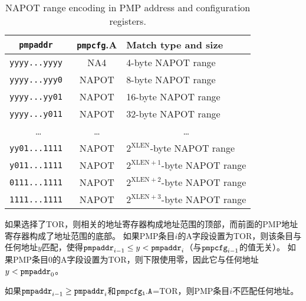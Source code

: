 {\begin{table*}[h!]
\begin{center}
  \begin{tabular}{|c|c|l|}
  \hline
  \tt pmpaddr    & {\tt pmpcfg}.A & Match type and size \\
  \hline
  \tt yyyy...yyyy & NA4   & 4-byte NAPOT range \\
  \tt yyyy...yyy0 & NAPOT & 8-byte NAPOT range \\
  \tt yyyy...yy01 & NAPOT & 16-byte NAPOT range \\
  \tt yyyy...y011 & NAPOT & 32-byte NAPOT range \\
  \multicolumn{1}{|c|}{\ldots} &  \ldots  & \multicolumn{1}{|c|}{\ldots} \\
  \tt yy01...1111 & NAPOT & $2^{\text{XLEN}}$-byte NAPOT range \\
  \tt y011...1111 & NAPOT & $2^{\text{XLEN}+1}$-byte NAPOT range \\
  \tt 0111...1111 & NAPOT & $2^{\text{XLEN}+2}$-byte NAPOT range \\
  \tt 1111...1111 & NAPOT & $2^{\text{XLEN}+3}$-byte NAPOT range \\
  \hline
  \end{tabular}
\end{center}
\caption{NAPOT range encoding in PMP address and configuration registers.}
\label{pmpcfg-napot}
\end{table*}

\iffalse
If TOR is selected, the associated address register forms the top of the
address range, and the preceding PMP address register forms the bottom of the
address range.  If PMP entry $i$'s A field is set to TOR, the entry matches
any address $y$ such that ${\tt pmpaddr}_{i-1}\leq y < {\tt pmpaddr}_i$
(irrespective of the value of ${\tt pmpcfg}_{i-1}$).
If
PMP entry 0's A field is set to TOR, zero is used for the lower bound, and so
it matches any address $y < {\tt pmpaddr}_0$.
\fi
如果选择了TOR，则相关的地址寄存器构成地址范围的顶部，而前面的PMP地址寄存器构成了地址范围的底部。
如果PMP条目$i$的A字段设置为TOR，则该条目与任何地址$y$匹配，使得${\tt pmpaddr}_{i-1}\leq y < {\tt pmpaddr}_i$（与${\tt pmpcfg}_{i-1}$的值无关）。
如果PMP条目0的A字段设置为TOR，则下限使用零，因此它与任何地址$ y < {\tt pmpaddr}_0$。

\iffalse
\begin{commentary}
If ${\tt pmpaddr}_{i-1}\geq {\tt pmpaddr}_i$ and ${\tt pmpcfg_i.A}$=TOR,
then PMP entry $i$ matches no addresses.
\end{commentary}
\fi
\begin{commentary}
如果${\tt pmpaddr}_{i-1}\geq {\tt pmpaddr}_i$和${\tt pmpcfg_i.A}$=TOR，则PMP条目$i$不匹配任何地址。
\end{commentary}

}
